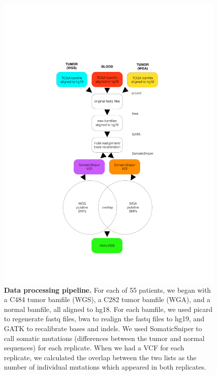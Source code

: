 \documentclass[11pt]{article} %
\begin{document}
\begin{figure}
\centerline{
\includegraphics[width=5in]{figs1and2combo.pdf} }
\caption{\textbf{Data processing pipeline.} For each of 55 patients, we began with a C484 tumor bamfile (WGS), a C282 tumor bamfile (WGA), and a normal bamfile, all aligned to hg18. For each bamfile, we used picard to regenerate fastq files, bwa to realign the fastq files to hg19, and GATK to recalibrate bases and indels. We used SomaticSniper to call somatic mutations (differences between the tumor and normal sequences) for each replicate. When we had a VCF for each replicate, we calculated the overlap between the two lists as the number of individual mutations which appeared in both replicates.}
\end{figure}
\end{document}
